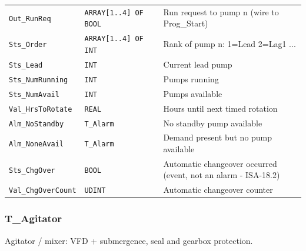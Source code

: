 {\begin{longtable}{@{}>{\raggedright\arraybackslash}p{3.4cm}>{\raggedright\arraybackslash}p{3.3cm}>{\raggedright\arraybackslash}p{1.3cm}>{\raggedright\arraybackslash}p{6.4cm}@{}}
\texttt{Out\_RunReq} & \texttt{ARRAY[1..4] OF BOOL} &  & Run request to pump n (wire to Prog\_Start) \\
\texttt{Sts\_Order} & \texttt{ARRAY[1..4] OF INT} &  & Rank of pump n: 1=Lead 2=Lag1 ... \\
\texttt{Sts\_Lead} & \texttt{INT} &  & Current lead pump \\
\texttt{Sts\_NumRunning} & \texttt{INT} &  & Pumps running \\
\texttt{Sts\_NumAvail} & \texttt{INT} &  & Pumps available \\
\texttt{Val\_HrsToRotate} & \texttt{REAL} &  & Hours until next timed rotation \\
\texttt{Alm\_NoStandby} & \texttt{T\_Alarm} &  & No standby pump available \\
\texttt{Alm\_NoneAvail} & \texttt{T\_Alarm} &  & Demand present but no pump available \\
\texttt{Sts\_ChgOver} & \texttt{BOOL} &  & Automatic changeover occurred (event, not an alarm - ISA-18.2) \\
\texttt{Val\_ChgOverCount} & \texttt{UDINT} &  & Automatic changeover counter \\
\bottomrule
\end{longtable}
}
\subsubsection*{T\_Agitator}
\label{app:pclib:tagitator}
Agitator /\allowbreak{} mixer: VFD + submergence, seal and gearbox protection.

